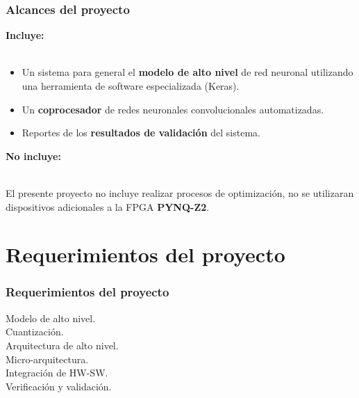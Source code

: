 \documentclass{beamer}
\begin{document}
\begin{frame}[allowframebreaks,t]

\frametitle{Alcances del proyecto}

\justifying

\textbf{Incluye:} \\\

\begin{itemize}
	\item Un sistema para general el \textbf{modelo de alto nivel} de red neuronal utilizando una herramienta de software especializada (Keras).    
	\item Un \textbf{coprocesador} de redes neuronales convolucionales automatizadas.
	\item Reportes de los \textbf{resultados de validación} del sistema.
\end{itemize}

\vspace{0.5cm}

\textbf{No incluye:} \\\

El presente proyecto no incluye realizar procesos de optimización, no se utilizaran dispositivos adicionales a la FPGA \textbf{PYNQ-Z2}.

\end{frame}

\section{Requerimientos del proyecto}

\begin{frame}[allowframebreaks,t]

\frametitle{Requerimientos del proyecto}

\Large 

Modelo de alto nivel.  						\\ \vspace{0.3cm}
Cuantización. 										\\ \vspace{0.3cm}
Arquitectura de alto nivel. 			\\ \vspace{0.3cm}
Micro-arquitectura. 							\\ \vspace{0.3cm}
Integración de HW-SW. 						\\ \vspace{0.3cm}
Verificación y validación. 				


\end{frame}
\end{document}
